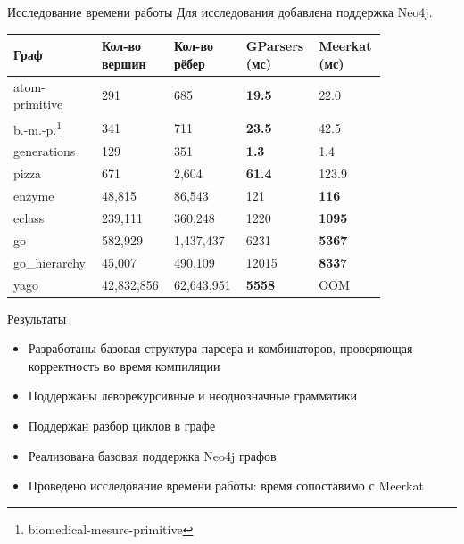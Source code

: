 \documentclass[aspectratio=169]{beamer}
\begin{document}
\begin{frame}{Исследование времени работы}
  Для исследования добавлена поддержка Neo4j.
  \vspace*{-0.5\baselineskip}
  \begin{table}[h]
    \renewcommand{\arraystretch}{1.1}
    \begin{tabular}{|b{0.21\linewidth}|b{0.16\linewidth}|b{0.16\linewidth}|b{0.15\linewidth}|b{0.15\linewidth}|}
      \hline
      \textbf{Граф}  & \textbf{Кол-во вершин} & \textbf{Кол-во рёбер} & \textbf{GParsers (мс)} & \textbf{Meerkat (мс)} \\
      \hline
      atom-primitive & 291        & 685        & \textbf{19.5} & 22.0 \\
      b.-m.-p.\footnote[1]{biomedical-mesure-primitive} & 341        & 711        & \textbf{23.5} & 42.5 \\
      generations    & 129        & 351        & \textbf{1.3}  & 1.4 \\
      pizza          & 671        & 2,604      & \textbf{61.4} & 123.9 \\
      \hline

      enzyme         & 48,815     & 86,543     & 121           & \textbf{116} \\
      eclass         & 239,111    & 360,248    & 1220          & \textbf{1095} \\
      go             & 582,929    & 1,437,437  & 6231          & \textbf{5367} \\
      go\_hierarchy  & 45,007     & 490,109    & 12015         & \textbf{8337} \\
      \hline
      yago           & 42,832,856 & 62,643,951 & \textbf{5558} & OOM \\
      \hline
    \end{tabular}
  \end{table}
\end{frame}


\begin{frame}{Результаты}
  \begin{itemize}
    \item Разработаны базовая структура парсера и комбинаторов, проверяющая корректность во время компиляции
    \item Поддержаны леворекурсивные и неоднозначные грамматики
    \item Поддержан разбор циклов в графе
    \item Реализована базовая поддержка Neo4j графов
    \item Проведено исследование времени работы: время сопоставимо с Meerkat
  \end{itemize}
\end{frame}
\end{document}
